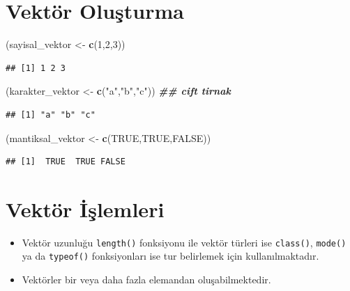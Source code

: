 \documentclass[
  oneside]{book}
\newenvironment{Shaded}{\begin{snugshade}}{\end{snugshade}}
\newcommand{\ConstantTok}[1]{\textcolor[rgb]{0.56,0.35,0.01}{#1}}
\newcommand{\DecValTok}[1]{\textcolor[rgb]{0.00,0.00,0.81}{#1}}
\newcommand{\DocumentationTok}[1]{\textcolor[rgb]{0.56,0.35,0.01}{\textbf{\textit{#1}}}}
\newcommand{\FunctionTok}[1]{\textcolor[rgb]{0.13,0.29,0.53}{\textbf{#1}}}
\newcommand{\NormalTok}[1]{#1}
\newcommand{\OtherTok}[1]{\textcolor[rgb]{0.56,0.35,0.01}{#1}}
\newcommand{\StringTok}[1]{\textcolor[rgb]{0.31,0.60,0.02}{#1}}
\begin{document}
\hypertarget{vektuxf6r-oluux15fturma}{%
\section{Vektör Oluşturma}\label{vektuxf6r-oluux15fturma}}

\begin{Shaded}
\begin{Highlighting}[]
\NormalTok{(sayisal\_vektor }\OtherTok{\textless{}{-}}  \FunctionTok{c}\NormalTok{(}\DecValTok{1}\NormalTok{,}\DecValTok{2}\NormalTok{,}\DecValTok{3}\NormalTok{))}
\end{Highlighting}
\end{Shaded}

\begin{verbatim}
## [1] 1 2 3
\end{verbatim}

\begin{Shaded}
\begin{Highlighting}[]
\NormalTok{(karakter\_vektor }\OtherTok{\textless{}{-}}  \FunctionTok{c}\NormalTok{(}\StringTok{"a"}\NormalTok{,}\StringTok{"b"}\NormalTok{,}\StringTok{"c"}\NormalTok{))  }\DocumentationTok{\#\# cift tirnak}
\end{Highlighting}
\end{Shaded}

\begin{verbatim}
## [1] "a" "b" "c"
\end{verbatim}

\begin{Shaded}
\begin{Highlighting}[]
\NormalTok{(mantiksal\_vektor }\OtherTok{\textless{}{-}} \FunctionTok{c}\NormalTok{(}\ConstantTok{TRUE}\NormalTok{,}\ConstantTok{TRUE}\NormalTok{,}\ConstantTok{FALSE}\NormalTok{))}
\end{Highlighting}
\end{Shaded}

\begin{verbatim}
## [1]  TRUE  TRUE FALSE
\end{verbatim}

\hypertarget{vektuxf6r-iux15flemleri}{%
\section{Vektör İşlemleri}\label{vektuxf6r-iux15flemleri}}

\begin{itemize}
\item
  Vektör uzunluğu \texttt{length()} fonksiyonu ile vektör türleri ise \texttt{class()}, \texttt{mode()} ya da \texttt{typeof()} fonksiyonları ise tur belirlemek için kullanılmaktadır.
\item
  Vektörler bir veya daha fazla elemandan oluşabilmektedir.
\end{itemize}
\end{document}
